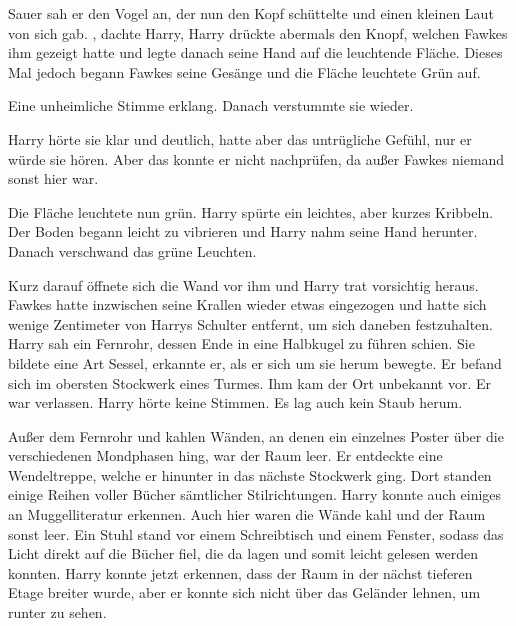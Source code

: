 Sauer sah er den Vogel an, der nun den Kopf schüttelte und einen kleinen Laut von sich gab. , dachte Harry,  Harry drückte abermals den Knopf, welchen Fawkes ihm gezeigt hatte und legte danach seine Hand auf die leuchtende Fläche. Dieses Mal jedoch begann Fawkes seine Gesänge und die Fläche leuchtete Grün auf.

Eine unheimliche Stimme erklang.  Danach verstummte sie wieder.

Harry hörte sie klar und deutlich, hatte aber das untrügliche Gefühl, nur er würde sie hören. Aber das konnte er nicht nachprüfen, da außer Fawkes niemand sonst hier war.

Die Fläche leuchtete nun grün. Harry spürte ein leichtes, aber kurzes Kribbeln. Der Boden begann leicht zu vibrieren und Harry nahm seine Hand herunter. Danach verschwand das grüne Leuchten.

Kurz darauf öffnete sich die Wand vor ihm und Harry trat vorsichtig heraus. Fawkes hatte inzwischen seine Krallen wieder etwas eingezogen und hatte sich wenige Zentimeter von Harrys Schulter entfernt, um sich daneben festzuhalten. Harry sah ein Fernrohr, dessen Ende in eine Halbkugel zu führen schien. Sie bildete eine Art Sessel, erkannte er, als er sich um sie herum bewegte. Er befand sich im obersten Stockwerk eines Turmes. Ihm kam der Ort unbekannt vor. Er war verlassen. Harry hörte keine Stimmen. Es lag auch kein Staub herum. 

Außer dem Fernrohr und kahlen Wänden, an denen ein einzelnes Poster über die verschiedenen Mondphasen hing, war der Raum leer. Er entdeckte eine Wendeltreppe, welche er hinunter in das nächste Stockwerk ging. Dort standen einige Reihen voller Bücher sämtlicher Stilrichtungen. Harry konnte auch einiges an Muggelliteratur erkennen. Auch hier waren die Wände kahl und der Raum sonst leer. Ein Stuhl stand vor einem Schreibtisch und einem Fenster, sodass das Licht direkt auf die Bücher fiel, die da lagen und somit leicht gelesen werden konnten. Harry konnte jetzt erkennen, dass der Raum in der nächst tieferen Etage breiter wurde, aber er konnte sich nicht über das Geländer lehnen, um runter zu sehen.

